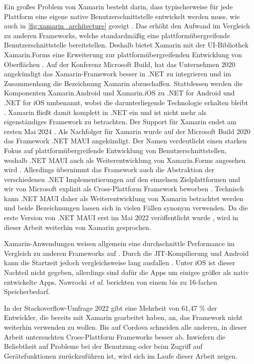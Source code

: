 Ein großes Problem von Xamarin besteht darin, dass typischerweise für jede Plattform eine eigene native Benutzerschnittstelle entwickelt werden muss, wie auch in \autoref{fig:xamarin_architecture} gezeigt \cite{Xamarin_Homepage}.
Das erhöht den Aufwand im Vergleich zu anderen Frameworks, welche standardmäßig eine plattformübergreifende Benutzerschnittstelle bereitstellen.
Deshalb bietet Xamarin mit der \ac{UI}-Bibliothek Xamarin.Forms eine Erweiterung zur plattformübergreifenden Entwicklung von Oberflächen \cite{Xamarin_Homepage}.
Auf der Konferenz Microsoft Build, hat das Unternehmen 2020 angekündigt das Xamarin-Framework besser in .NET zu integrieren und im Zusammenhang die Bezeichnung Xamarin abzuschaffen.
Stattdessen werden die Komponenten Xamarin.Android und Xamarin.iOS zu .NET for Android und .NET for iOS umbenannt, wobei die darunterliegende Technologie erhalten bleibt \cite{MS_Build_2020}.
Xamarin fließt damit komplett in .NET ein und ist nicht mehr als eigenständiges Framework zu betrachten.
Der Support für Xamarin endet am ersten Mai 2024 \cite{Xamarin_EOL}.
Als Nachfolger für Xamarin wurde auf der Microsoft Build 2020 das Framework .NET \ac{MAUI} angekündigt.
Der Namen verdeutlicht einen starken Fokus auf plattformübergreifende Entwicklung von Benutzerschnittstellen, weshalb .NET \ac{MAUI} auch als Weiterentwicklung von Xamarin.Forms angesehen wird \cite{NET_MAUI_Introduction}.
Allerdings übernimmt das Framework auch die Abstraktion der verschiedenen .NET Implementierungen auf den einzelnen Zielplattformen und wir von Microsoft explizit als Cross-Plattform Framework beworben \cite{NET_MAUI}.
Technisch kann .NET \ac{MAUI} daher als Weiterentwicklung von Xamarin betrachtet werden und beide Bezeichnungen lassen sich in vielen Fällen synonym verwenden.
Da die erste Version von .NET \ac{MAUI} erst im Mai 2022 veröffentlicht wurde \cite{NET_MAUI_Release}, wird in dieser Arbeit weiterhin von Xamarin gesprochen.


Xamarin-Anwendungen weisen allgemein eine durchschnittle Performance im Vergleich zu anderen Frameworks auf \cite{Nawrocki_Comparison_Hybrid_Native_Frameworks, Bakker_Xamarin_XamarinForms_Native, Xamarin_Homepage}.
Durch die \ac{JIT}-Kompilierung und Android kann die Startzeit jedoch vergleichsweise lang ausfallen \cite{Nawrocki_Comparison_Hybrid_Native_Frameworks}.
Unter iOS ist dieser Nachteil nicht gegeben, allerdings sind dafür die Apps um einiges größer als nativ entwickelte Apps.
Nawrocki \textit{et al.} \cite{Nawrocki_Comparison_Hybrid_Native_Frameworks} berichten von einem bis zu 16-fachen Speicherbedarf.

In der Stackoverflow-Umfrage 2022 \cite{Stackoverflow_2022} gibt eine Mehrheit von 61,47 \% der Entwickler, die bereits mit Xamarin gearbeitet haben, an, das Framework nicht weiterhin verwenden zu wollen.
Bis auf Cordova schneiden alle anderen, in dieser Arbeit untersuchten Cross-Plattform Frameworks besser ab.
Inwiefern die Beliebtheit auf Probleme bei der Benutzung oder beim Zugriff auf Gerätefunktionen zurückzuführen ist, wird sich im Laufe dieser Arbeit zeigen.